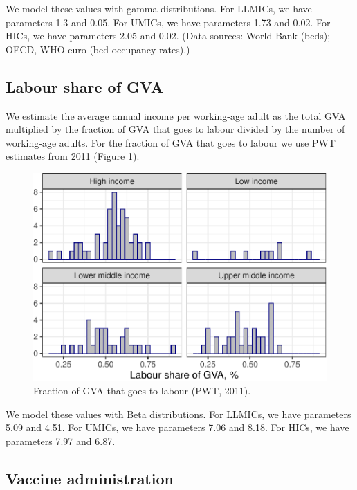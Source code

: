 \documentclass[
]{article}
\makeatletter
\newcounter{figno}
\newenvironment{fignos:no-prefix-figure-caption}{
  \caption@ifcompatibility{}{
    \let\oldthefigure\thefigure
    \let\oldtheHfigure\theHfigure
    \renewcommand{\thefigure}{figno:\thefigno}
    \renewcommand{\theHfigure}{figno:\thefigno}
    \stepcounter{figno}
    \captionsetup{labelformat=empty}
  }
}{
  \caption@ifcompatibility{}{
    \captionsetup{labelformat=default}
    \let\thefigure\oldthefigure
    \let\theHfigure\oldtheHfigure
    \addtocounter{figure}{-1}
  }
}
\makeatother
\begin{document}
We model these values with gamma distributions. For LLMICs, we have parameters 1.3 and 0.05. For UMICs, we have parameters 1.73 and 0.02. For HICs, we have parameters 2.05 and 0.02. (Data sources: World Bank (beds); OECD, WHO euro (bed occupancy rates).)

\hypertarget{labour-share-of-gva}{%
\subsection{Labour share of GVA}\label{labour-share-of-gva}}

We estimate the average annual income per working-age adult as the total GVA multiplied by the fraction of GVA that goes to labour divided by the number of working-age adults. For the fraction of GVA that goes to labour we use PWT estimates from 2011 (Figure \ref{fig:labsh}).

\begin{fignos:no-prefix-figure-caption}

\begin{figure}
\centering
\includegraphics{README_files/figure-latex/labsh-1.pdf}
\caption{\label{fig:labsh}Fraction of GVA that goes to labour (PWT, 2011).}
\end{figure}

\end{fignos:no-prefix-figure-caption}

We model these values with Beta distributions. For LLMICs, we have parameters 5.09 and 4.51. For UMICs, we have parameters 7.06 and 8.18. For HICs, we have parameters 7.97 and 6.87.

\hypertarget{vaccine-administration}{%
\subsection{Vaccine administration}\label{vaccine-administration}}
\end{document}

